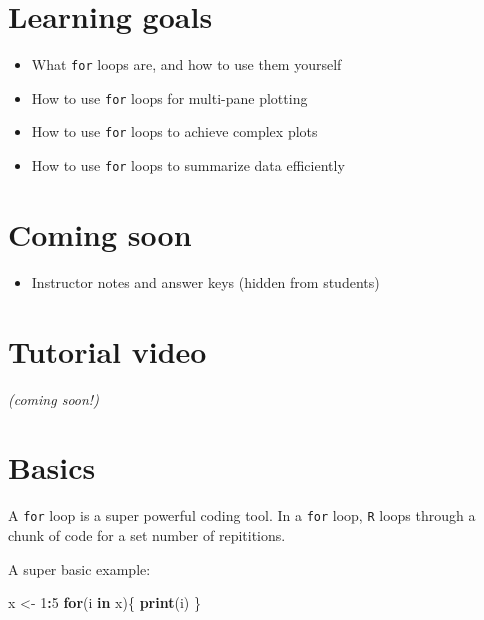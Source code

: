 \documentclass[
]{book}
\newenvironment{Shaded}{\begin{snugshade}}{\end{snugshade}}
\newcommand{\ControlFlowTok}[1]{\textcolor[rgb]{0.13,0.29,0.53}{\textbf{#1}}}
\newcommand{\DecValTok}[1]{\textcolor[rgb]{0.00,0.00,0.81}{#1}}
\newcommand{\KeywordTok}[1]{\textcolor[rgb]{0.13,0.29,0.53}{\textbf{#1}}}
\newcommand{\NormalTok}[1]{#1}
\newcommand{\OperatorTok}[1]{\textcolor[rgb]{0.81,0.36,0.00}{\textbf{#1}}}
\newcommand{\StringTok}[1]{\textcolor[rgb]{0.31,0.60,0.02}{#1}}
\providecommand{\tightlist}{%
  \setlength{\itemsep}{0pt}\setlength{\parskip}{0pt}}
\begin{document}
\hypertarget{learning-goals-5}{%
\section*{Learning goals}\label{learning-goals-5}}

\begin{itemize}
\tightlist
\item
  What \texttt{for} loops are, and how to use them yourself
\item
  How to use \texttt{for} loops for multi-pane plotting\\
\item
  How to use \texttt{for} loops to achieve complex plots\\
\item
  How to use \texttt{for} loops to summarize data efficiently
\end{itemize}

\hypertarget{coming-soon}{%
\section*{Coming soon}\label{coming-soon}}

\begin{itemize}
\tightlist
\item
  Instructor notes and answer keys (hidden from students)
\end{itemize}

\hypertarget{tutorial-video-1}{%
\section*{Tutorial video}\label{tutorial-video-1}}

\emph{(coming soon!)}

\hypertarget{basics}{%
\section*{Basics}\label{basics}}

A \texttt{for} loop is a super powerful coding tool. In a \texttt{for} loop, \texttt{R} loops through a chunk of code for a set number of repititions.

A super basic example:

\begin{Shaded}
\begin{Highlighting}[]
\NormalTok{x <-}\StringTok{ }\DecValTok{1}\OperatorTok{:}\DecValTok{5}
\ControlFlowTok{for}\NormalTok{(i }\ControlFlowTok{in}\NormalTok{ x)\{}
  \KeywordTok{print}\NormalTok{(i)}
\NormalTok{\}}
\end{Highlighting}
\end{Shaded}
\end{document}
